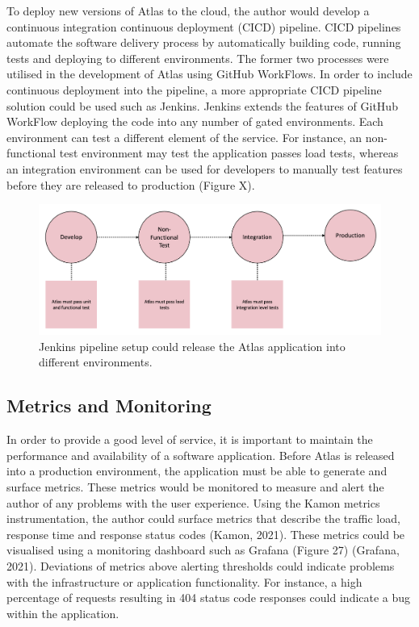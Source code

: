 \documentclass{article}
\begin{document}
To deploy new versions of Atlas to the cloud, the author would develop a continuous integration continuous deployment (CICD) pipeline. CICD pipelines automate the software delivery process by automatically building code, running tests and deploying to different environments. The former two processes were utilised in the development of Atlas using GitHub WorkFlows. In order to include continuous deployment into the pipeline, a more appropriate CICD pipeline solution could be used such as Jenkins. Jenkins extends the features of GitHub WorkFlow deploying the code into any number of gated environments. Each environment can test a different element of the service. For instance, an non-functional test environment may test the application passes load tests, whereas an integration environment can be used for developers to manually test features before they are released to production (Figure X).

\begin{figure}[!htb]
  \centering
      \includegraphics[width=1\textwidth]{images/jenkins.png}
  \caption{Jenkins pipeline setup could release the Atlas application into different environments.}
\end{figure}

\subsection{Metrics and Monitoring}

In order to provide a good level of service, it is important to maintain the performance and availability of a software application. Before Atlas is released into a production environment, the application must be able to generate and surface metrics. These metrics would be monitored to measure and alert the author of any problems with the user experience. Using the Kamon metrics instrumentation, the author could surface metrics that describe the traffic load, response time and response status codes (Kamon, 2021). These metrics could be visualised using a monitoring dashboard such as Grafana (Figure 27) (Grafana, 2021). Deviations of metrics above alerting thresholds could indicate problems with the infrastructure or application functionality. For instance, a high percentage of requests resulting in 404 status code responses could indicate a bug within the application. 
\end{document}
